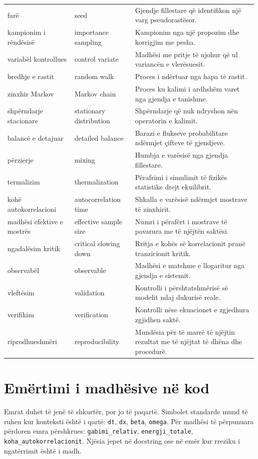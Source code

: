 \begin{longtable}{p{}p{}p{}}
farë & seed & Gjendje fillestare që identifikon një varg pseudorastësor.\\
kampionim i rëndësisë & importance sampling & Kampionim nga një propozim dhe korrigjim me pesha.\\
variabël kontrollues & control variate & Madhësi me pritje të njohur që ul variancën e vlerësuesit.\\
bredhje e rastit & random walk & Proces i ndërtuar nga hapa të rastit.\\
zinxhir Markov & Markov chain & Proces ku kalimi i ardhshëm varet nga gjendja e tanishme.\\
shpërndarje stacionare & stationary distribution & Shpërndarje që nuk ndryshon nën operatorin e kalimit.\\
balancë e detajuar & detailed balance & Barazi e flukseve probabilitare ndërmjet çifteve të gjendjeve.\\
përzierje & mixing & Humbja e varësisë nga gjendja fillestare.\\
termalizim & thermalization & Përafrimi i simulimit të fizikës statistike drejt ekuilibrit.\\
kohë autokorrelacioni & autocorrelation time & Shkalla e varësisë ndërmjet mostrave të zinxhirit.\\
madhësi efektive e mostrës & effective sample size & Numri i përafërt i mostrave të pavarura me të njëjtën saktësi.\\
ngadalësim kritik & critical slowing down & Rritja e kohës së korrelacionit pranë tranzicionit kritik.\\
observabël & observable & Madhësi e matshme e llogaritur nga gjendja e sistemit.\\
vleftësim & validation & Kontrolli i përshtatshmërisë së modelit ndaj dukurisë reale.\\
verifikim & verification & Kontrolli nëse ekuacionet e zgjedhura zgjidhen saktë.\\
riprodhueshmëri & reproducibility & Mundësia për të marrë të njëjtin rezultat me të njëjtat të dhëna dhe procedurë.\\
\bottomrule
\end{longtable}
\normalsize

\section{Emërtimi i madhësive në kod}
Emrat duhet të jenë të shkurtër, por jo të paqartë. Simbolet standarde mund të ruhen kur konteksti është i qartë: \texttt{dt}, \texttt{dx}, \texttt{beta}, \texttt{omega}. Për madhësi të përpunuara përdoren emra përshkrues: \texttt{gabimi\_relativ}, \texttt{energji\_totale}, \texttt{koha\_autokorrelacionit}. Njësia jepet në docstring ose në emër kur rreziku i ngatërrimit është i madh.


